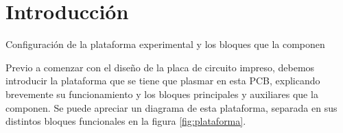 \section{Introducción} \label{introduccion}
\thispagestyle{plain}

\vspace{0.5cm}

\Large\scshape
\begin{center}
    {\Medium Configuración de la plataforma experimental y los bloques que la componen}
\end{center}
\normalfont

\divider

Previo a comenzar con el diseño de la placa de circuito impreso, debemos introducir la plataforma que se tiene que plasmar en esta PCB, explicando brevemente su funcionamiento y los bloques principales y auxiliares que la componen. Se puede apreciar un diagrama de esta plataforma, separada en sus distintos bloques funcionales en la figura \ref{fig:plataforma}.\\

